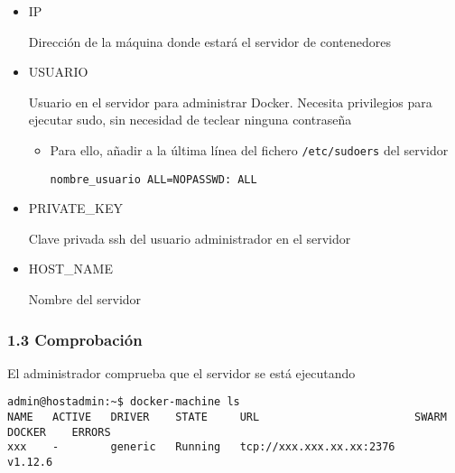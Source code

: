 \documentclass[ucs]{beamer}
\begin{document}
\begin{frame}[fragile]
\frametitle{}
\begin{itemize}
\item
IP

Dirección de la máquina donde estará el servidor de contenedores

\item
USUARIO

Usuario en el servidor para administrar Docker. Necesita privilegios
para ejecutar sudo,  sin necesidad de teclear ninguna contraseña
\begin{itemize}
\item
Para ello, añadir a la última línea del fichero  \verb|/etc/sudoers| del servidor

\verb|nombre_usuario ALL=NOPASSWD: ALL|



\end{itemize}

\item
PRIVATE\_KEY

Clave privada ssh del usuario administrador en el servidor


\item
HOST\_NAME


Nombre del servidor
\end{itemize}

\end{frame}





\begin{frame}[fragile]
\frametitle{1.3 Comprobación}

El administrador comprueba que el servidor se está ejecutando
  \begin{scriptsize}
  \begin{verbatim}
admin@hostadmin:~$ docker-machine ls
NAME   ACTIVE   DRIVER    STATE     URL                        SWARM   DOCKER    ERRORS
xxx    -        generic   Running   tcp://xxx.xxx.xx.xx:2376           v1.12.6   
  \end{verbatim}
  \end{scriptsize}

\end{frame}
\end{document}
